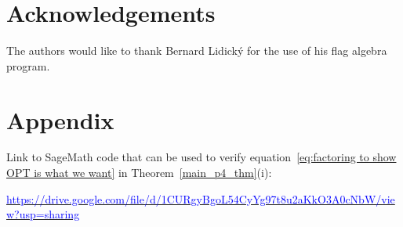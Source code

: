 \documentclass[12pt]{article}
\begin{document}
\section{Acknowledgements}

The authors would like to thank Bernard Lidick\'{y} for the use of his flag algebra program.




\section{Appendix}

Link to SageMath code that can be used to verify equation~\eqref{eq:factoring to show OPT is what we want} in Theorem~\ref{main_p4_thm}(i):

\medskip

\href{https://drive.google.com/file/d/1CURgyBgoL54CyYg97t8u2aKkO3A0cNbW/view?usp=sharing}{\textcolor{blue}{https://drive.google.com/file/d/1CURgyBgoL54CyYg97t8u2aKkO3A0cNbW/view?usp=sharing}}
\end{document}
